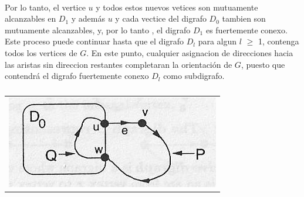 \paragraph{}
Por lo tanto, el vertice $u$ y todos estos nuevos vetices son mutuamente alcanzables en $D_1$ y además $u$ y cada vectice del digrafo $D_0$ tambien son mutuamente alcanzables, y, por lo tanto , el digrafo $D_1$ es fuertemente conexo. Este proceso puede continuar hasta que el digrafo $D_l$ para algun $l$ $\geq$ 1, contenga todos los vertices de $G$. En este punto, cualquier asignacion de direcciones hacia las aristas sin direccion restantes completaran la orientación de $G$, puesto que contendrá el digrafo fuertemente conexo $D_l$ como subdigrafo.



	\begin{table}[h!] %
		\centering %
			\begin{tabular}{c}
				\includegraphics[scale=0.7]{./otros/figura3.jpg} 

				\end{tabular}
				\caption{} %
				\label{} %
	\end{table}

